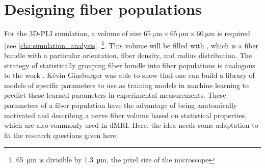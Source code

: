 \section{Designing fiber populations}
% 
For the \ac{3D-PLI} simulation, a volume of size $\SI{65}{\micro\meter} \times \SI{65}{\micro\meter} \times \SI{60}{\micro\meter}$ is required (see \cref{cha:simulation_analysis}. \footnote{\SI{65}{\micro\meter} is divisible by \SI{1.3}{\micro\meter}, the pixel size of the microscope}.
This volume will be filled with , which is a fiber bundle with a particular orientation, fiber density, and radius distribution.
The strategy of statistically grouping fiber bundle into fiber populations is analogous to the work \cite{Ginsburger2018, Ginsburger2019,ginsburgerDis2019}. 
K{\'{e}}vin Ginsburger was able to show that one can build a library of models of specific parameters to use as training models in machine learning to predict these learned parameters in experimental measurements.
These parameters of a fiber population have the advantage of being anatomically motivated and describing a nerve fiber volume based on statistical properties, which are also commonly used in \ac{dMRI}.
Here, the idea needs some adaptation to fit the research questions given here.
% 
